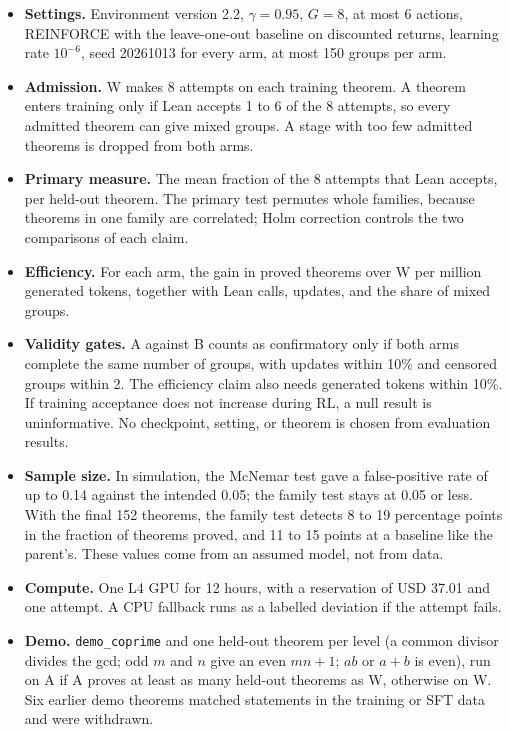 \documentclass[11pt]{article}
\newcommand{\code}[1]{\texttt{#1}}
\begin{document}
\begin{itemize}
\item \textbf{Settings.} Environment version 2.2, $\gamma = 0.95$, $G = 8$, at most 6 actions, REINFORCE with the leave-one-out baseline on discounted returns, learning rate $10^{-6}$, seed 20261013 for every arm, at most 150 groups per arm.
\item \textbf{Admission.} W makes 8 attempts on each training theorem. A theorem enters training only if Lean accepts 1 to 6 of the 8 attempts, so every admitted theorem can give mixed groups. A stage with too few admitted theorems is dropped from both arms.
\item \textbf{Primary measure.} The mean fraction of the 8 attempts that Lean accepts, per held-out theorem. The primary test permutes whole families, because theorems in one family are correlated; Holm correction controls the two comparisons of each claim.
\item \textbf{Efficiency.} For each arm, the gain in proved theorems over W per million generated tokens, together with Lean calls, updates, and the share of mixed groups.
\item \textbf{Validity gates.} A against B counts as confirmatory only if both arms complete the same number of groups, with updates within 10\% and censored groups within 2. The efficiency claim also needs generated tokens within 10\%. If training acceptance does not increase during RL, a null result is uninformative. No checkpoint, setting, or theorem is chosen from evaluation results.
\item \textbf{Sample size.} In simulation, the McNemar test gave a false-positive rate of up to 0.14 against the intended 0.05; the family test stays at 0.05 or less. With the final 152 theorems, the family test detects 8 to 19 percentage points in the fraction of theorems proved, and 11 to 15 points at a baseline like the parent's. These values come from an assumed model, not from data.
\item \textbf{Compute.} One L4 GPU for 12 hours, with a reservation of USD 37.01 and one attempt. A CPU fallback runs as a labelled deviation if the attempt fails.
\item \textbf{Demo.} \code{demo\_coprime} and one held-out theorem per level (a common divisor divides the gcd; odd $m$ and $n$ give an even $mn + 1$; $ab$ or $a + b$ is even), run on A if A proves at least as many held-out theorems as W, otherwise on W. Six earlier demo theorems matched statements in the training or SFT data and were withdrawn.
\end{itemize}
\end{document}
